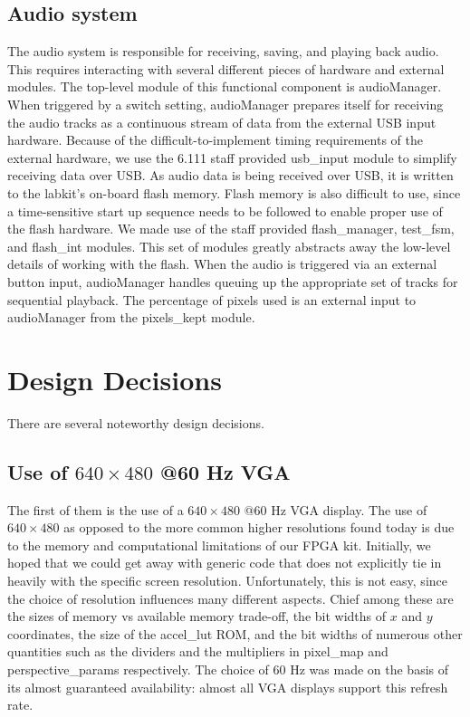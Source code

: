 \documentclass{article}
\begin{document}
\subsection{Audio system}
The audio system is responsible for receiving, saving, and playing back audio.
This requires interacting with several different pieces of hardware and external modules.
The top-level module of this functional component is audioManager.
When triggered by a switch setting, audioManager prepares itself for receiving the audio tracks as a continuous stream of data from the external USB input hardware.
Because of the difficult-to-implement timing requirements of the external hardware, we use the 6.111 staff provided usb\_input module to simplify receiving data over USB.
As audio data is being received over USB, it is written to the labkit's on-board flash memory.
Flash memory is also difficult to use, since a time-sensitive start up sequence needs to be followed to enable proper use of the flash hardware.
We made use of the staff provided flash\_manager, test\_fsm, and flash\_int modules. This set of modules greatly abstracts away the low-level details of working with the flash.
When the audio is triggered via an external button input, audioManager handles queuing up the appropriate set of tracks for sequential playback. The percentage of pixels used is an external input to audioManager from the pixels\_kept module.

\section{Design Decisions}

There are several noteworthy design decisions.

\subsection{Use of $640 \times 480$ @60 Hz VGA}
The first of them is the use of a $640 \times 480$ @60 Hz VGA display.
The use of $640 \times 480$  as opposed to the more common higher resolutions found today is due to the memory and computational limitations of our FPGA kit.
Initially, we hoped that we could get away with generic code that does not explicitly tie in heavily with the specific screen resolution.
Unfortunately, this is not easy, since the choice of resolution influences many different aspects.
Chief among these are the sizes of memory vs available memory trade-off, the bit widths of $x$ and $y$ coordinates, the size of the accel\_lut ROM,
and the bit widths of numerous other quantities such as the dividers and the multipliers in pixel\_map and perspective\_params respectively.
The choice of 60 Hz was made on the basis of its almost guaranteed availability: almost all VGA displays support this refresh rate.
\end{document}
